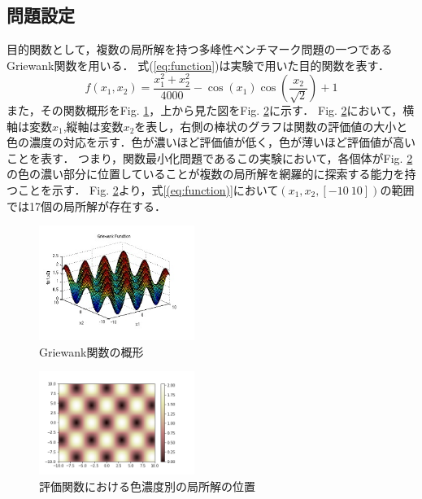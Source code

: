 \documentclass{jarticle}
\begin{document}
\subsection{問題設定}
目的関数として，複数の局所解を持つ多峰性ベンチマーク問題の一つであるGriewank関数\cite{6}を用いる．
式(\ref{eq:function})は実験で用いた目的関数を表す．
\begin{equation}
\label{eq:function}
  f(x_1,x_2)=\frac{x_1^2+x_2^2}{4000}-\cos(x_1)\cos(\frac{x_2}{\sqrt{2}})+1  
\end{equation}
また，その関数概形をFig. \ref{fig:griewank}，上から見た図をFig. \ref{fig:map}に示す．
Fig. \ref{fig:map}において，横軸は変数$x_1$,縦軸は変数$x_2$を表し，右側の棒状のグラフは関数の評価値の大小と色の濃度の対応を示す．色が濃いほど評価値が低く，色が薄いほど評価値が高いことを表す．
つまり，関数最小化問題であるこの実験において，各個体がFig. \ref{fig:map}の色の濃い部分に位置していることが複数の局所解を網羅的に探索する能力を持つことを示す．
Fig. \ref{fig:map}より，式\ref{(eq:function)}において${(x_1,x_2,[-10 \ 10])}$の範囲では17個の局所解が存在する．
\begin{figure}[t]
\begin{center}
\includegraphics[width=0.45\textwidth]{Griewank.bmp}
\caption{Griewank関数の概形}
\label{fig:griewank}
\end{center}
\end{figure}

\begin{figure}[t]
\begin{center}
\includegraphics[width=0.45\textwidth]{Griewank_z.bmp}
\caption{評価関数における色濃度別の局所解の位置}
\label{fig:map}
\end{center}
\end{figure}
\end{document}

